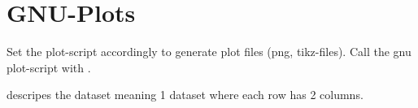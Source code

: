 \chapter{GNU-Plots}
Set the plot-script accordingly to generate plot files (png, tikz-files). Call the gnu plot-script with .
\begin{center}

\end{center}
 descripes the dataset meaning 1 dataset where each row has 2 columns.